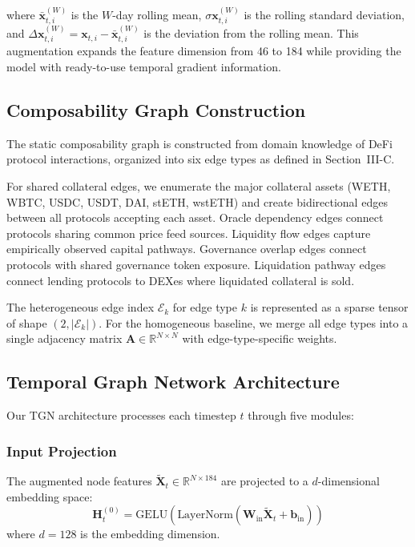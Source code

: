 \documentclass[journal]{IEEEtran}
\begin{document}
where $\bar{\mathbf{x}}_{t,i}^{(W)}$ is the $W$-day rolling mean, $\sigma\mathbf{x}_{t,i}^{(W)}$ is the rolling standard deviation, and $\Delta\mathbf{x}_{t,i}^{(W)} = \mathbf{x}_{t,i} - \bar{\mathbf{x}}_{t,i}^{(W)}$ is the deviation from the rolling mean. This augmentation expands the feature dimension from 46 to 184 while providing the model with ready-to-use temporal gradient information.

\subsection{Composability Graph Construction}

The static composability graph is constructed from domain knowledge of DeFi protocol interactions, organized into six edge types as defined in Section~III-C.

For shared collateral edges, we enumerate the major collateral assets (WETH, WBTC, USDC, USDT, DAI, stETH, wstETH) and create bidirectional edges between all protocols accepting each asset. Oracle dependency edges connect protocols sharing common price feed sources. Liquidity flow edges capture empirically observed capital pathways. Governance overlap edges connect protocols with shared governance token exposure. Liquidation pathway edges connect lending protocols to DEXes where liquidated collateral is sold.

The heterogeneous edge index $\mathcal{E}_k$ for edge type $k$ is represented as a sparse tensor of shape $(2, |\mathcal{E}_k|)$. For the homogeneous baseline, we merge all edge types into a single adjacency matrix $\mathbf{A} \in \mathbb{R}^{N \times N}$ with edge-type-specific weights.

\subsection{Temporal Graph Network Architecture}

Our TGN architecture processes each timestep $t$ through five modules:

\subsubsection{Input Projection}
The augmented node features $\tilde{\mathbf{X}}_t \in \mathbb{R}^{N \times 184}$ are projected to a $d$-dimensional embedding space:
\begin{equation}
    \mathbf{H}_t^{(0)} = \text{GELU}\left(\text{LayerNorm}\left(\mathbf{W}_{\text{in}} \tilde{\mathbf{X}}_t + \mathbf{b}_{\text{in}}\right)\right)
\end{equation}
where $d = 128$ is the embedding dimension.
\end{document}
